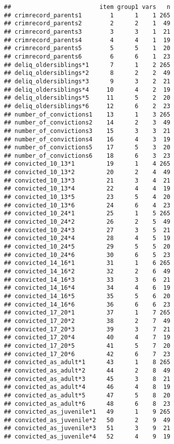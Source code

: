 \documentclass[]{tufte-handout}
\begin{document}
\begin{verbatim}
##                         item group1 vars   n
## crimrecord_parents1        1      1    1 265
## crimrecord_parents2        2      2    1  49
## crimrecord_parents3        3      3    1  21
## crimrecord_parents4        4      4    1  19
## crimrecord_parents5        5      5    1  20
## crimrecord_parents6        6      6    1  23
## deliq_oldersiblings*1      7      1    2 265
## deliq_oldersiblings*2      8      2    2  49
## deliq_oldersiblings*3      9      3    2  21
## deliq_oldersiblings*4     10      4    2  19
## deliq_oldersiblings*5     11      5    2  20
## deliq_oldersiblings*6     12      6    2  23
## number_of_convictions1    13      1    3 265
## number_of_convictions2    14      2    3  49
## number_of_convictions3    15      3    3  21
## number_of_convictions4    16      4    3  19
## number_of_convictions5    17      5    3  20
## number_of_convictions6    18      6    3  23
## convicted_10_13*1         19      1    4 265
## convicted_10_13*2         20      2    4  49
## convicted_10_13*3         21      3    4  21
## convicted_10_13*4         22      4    4  19
## convicted_10_13*5         23      5    4  20
## convicted_10_13*6         24      6    4  23
## convicted_10_24*1         25      1    5 265
## convicted_10_24*2         26      2    5  49
## convicted_10_24*3         27      3    5  21
## convicted_10_24*4         28      4    5  19
## convicted_10_24*5         29      5    5  20
## convicted_10_24*6         30      6    5  23
## convicted_14_16*1         31      1    6 265
## convicted_14_16*2         32      2    6  49
## convicted_14_16*3         33      3    6  21
## convicted_14_16*4         34      4    6  19
## convicted_14_16*5         35      5    6  20
## convicted_14_16*6         36      6    6  23
## convicted_17_20*1         37      1    7 265
## convicted_17_20*2         38      2    7  49
## convicted_17_20*3         39      3    7  21
## convicted_17_20*4         40      4    7  19
## convicted_17_20*5         41      5    7  20
## convicted_17_20*6         42      6    7  23
## convicted_as_adult*1      43      1    8 265
## convicted_as_adult*2      44      2    8  49
## convicted_as_adult*3      45      3    8  21
## convicted_as_adult*4      46      4    8  19
## convicted_as_adult*5      47      5    8  20
## convicted_as_adult*6      48      6    8  23
## convicted_as_juvenile*1   49      1    9 265
## convicted_as_juvenile*2   50      2    9  49
## convicted_as_juvenile*3   51      3    9  21
## convicted_as_juvenile*4   52      4    9  19

\end{verbatim}
\end{document}
